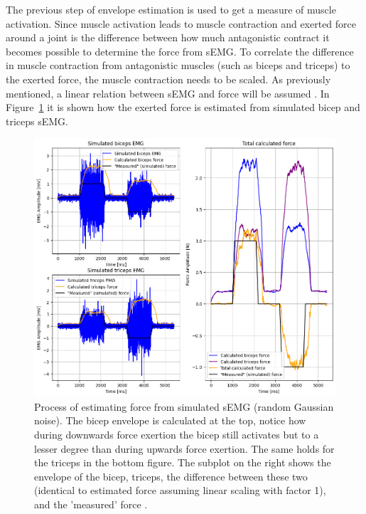 The previous step of envelope estimation is used to get a measure of muscle activation. Since muscle activation leads to muscle contraction and exerted force around a joint is the difference between how much antagonistic contract \cite{human_robotics} it becomes possible to determine the force from sEMG. To correlate the difference in muscle contraction from antagonistic muscles (such as biceps and triceps) to the exerted force, the muscle contraction needs to be scaled. As previously mentioned, a linear relation between sEMG and force will be assumed \cite{adaptive_filter_dry_electrode} \cite{interpreting_muscle_function_from_emg}. In Figure~\ref{fig:force_simulation} it is shown how the exerted force is estimated from simulated bicep and triceps sEMG. 

\begin{figure}[h!t]
	\begin{center}
		\includegraphics[width=1.0\columnwidth]{images/force_simulation.png}
	\end{center}
	\caption{Process of estimating force from simulated sEMG (random Gaussian noise). The bicep envelope is calculated at the top, notice how during downwards force exertion the bicep still activates but to a lesser degree than during upwards force exertion. The same holds for the triceps in the bottom figure. The subplot on the right shows the envelope of the bicep, triceps, the difference between these two (identical to estimated force assuming linear scaling with factor 1), and the 'measured' force .}
	\label{fig:force_simulation}
\end{figure}

